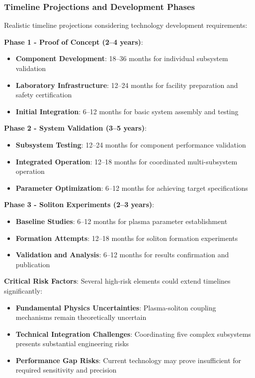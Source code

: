 \documentclass[12pt,a4paper]{article}
\begin{document}
\subsubsection{Timeline Projections and Development Phases}
Realistic timeline projections considering technology development requirements:

\textbf{Phase 1 - Proof of Concept (2--4 years)}:
\begin{itemize}
\item \textbf{Component Development}: 18--36 months for individual subsystem validation
\item \textbf{Laboratory Infrastructure}: 12--24 months for facility preparation and safety certification
\item \textbf{Initial Integration}: 6--12 months for basic system assembly and testing
\end{itemize}

\textbf{Phase 2 - System Validation (3--5 years)}:
\begin{itemize}
\item \textbf{Subsystem Testing}: 12--24 months for component performance validation
\item \textbf{Integrated Operation}: 12--18 months for coordinated multi-subsystem operation
\item \textbf{Parameter Optimization}: 6--12 months for achieving target specifications
\end{itemize}

\textbf{Phase 3 - Soliton Experiments (2--3 years)}:
\begin{itemize}
\item \textbf{Baseline Studies}: 6--12 months for plasma parameter establishment
\item \textbf{Formation Attempts}: 12--18 months for soliton formation experiments
\item \textbf{Validation and Analysis}: 6--12 months for results confirmation and publication
\end{itemize}

\textbf{Critical Risk Factors}: Several high-risk elements could extend timelines significantly:
\begin{itemize}
\item \textbf{Fundamental Physics Uncertainties}: Plasma-soliton coupling mechanisms remain theoretically uncertain
\item \textbf{Technical Integration Challenges}: Coordinating five complex subsystems presents substantial engineering risks
\item \textbf{Performance Gap Risks}: Current technology may prove insufficient for required sensitivity and precision
\end{itemize}
\end{document}
